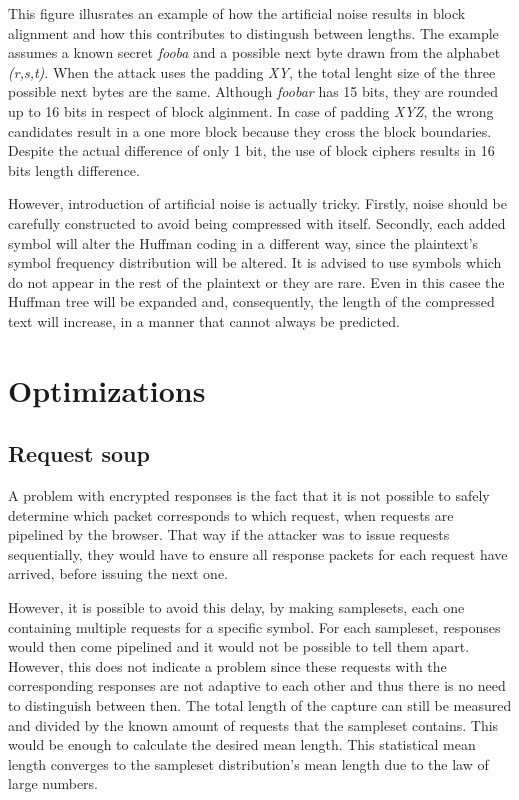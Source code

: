 This figure illusrates an example of how the artificial noise results in block alignment and 
how this contributes to distingush between lengths. The example assumes a known secret
\textit{fooba} and a possible next byte drawn from the alphabet \textit{(r,s,t)}.
When the attack uses the padding \textit{XY}, the total lenght size 
of the three possible next bytes are the same. Although \textit{foobar} has 15 bits,
they are rounded up to 16 bits in respect of block alginment.
In case of padding \textit{XYZ}, the wrong candidates result in a one more block 
because they cross the block boundaries. Despite the actual difference of only 1 bit,
the use of block ciphers results in 16 bits length difference.


However, introduction of artificial noise is actually tricky. Firstly, noise should be carefully constructed
to avoid being compressed with itself. Secondly, each added symbol will alter the Huffman coding in a
different way, since the plaintext's symbol frequency distribution will be altered. It is advised to use symbols
which do not appear in the rest of the plaintext or they are rare. Even in this casee
 the Huffman tree will be expanded and, consequently, the length of the compressed text will increase,
 in a manner that cannot always be predicted.

\section{Optimizations}\label{sec:optimizations}


\subsection{Request soup}\label{subsec:soup}

A problem with encrypted responses is the fact that it is not possible to safely
determine which packet corresponds to which request, when requests are pipelined
by the browser. That way if the attacker was to issue
requests sequentially, they would have to ensure all response packets for each request
have arrived, before issuing the next one.

However, it is possible to avoid this delay, by making samplesets, each one containing multiple
requests for a specific symbol. For each sampleset, responses would then come pipelined and it
would not be possible to tell them apart. However, this does not indicate a problem since these requests
with the corresponding responses are not adaptive to each other and thus there is no
need to distinguish between then. The total length of the capture can still be
measured and divided by the known amount of requests that the sampleset
contains. This would be enough to calculate the desired mean length.
This statistical mean length converges to the sampleset distribution's mean length due to
the law of large numbers.

